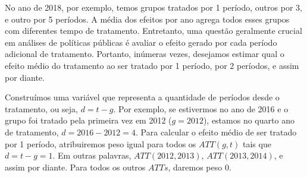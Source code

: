 \documentclass[portugues]{article}
\begin{document}
No ano de 2018, por exemplo, temos grupos tratados por 1 período, outros por 3, e outro por 5 períodos. A média dos efeitos por ano agrega todos esses grupos com diferentes tempo de tratamento. Entretanto, uma questão geralmente crucial em análises de políticas públicas é avaliar o efeito gerado por cada período adicional de tratamento. Portanto, inúmeras vezes, desejamos estimar qual o efeito médio do tratamento ao ser tratado por 1 período, por 2 períodos, e assim por diante. 

Construímos uma variável que representa a quantidade de períodos desde o tratamento, ou seja, $d = t - g$. Por exemplo, se estivermos no ano de 2016 e o grupo foi tratado pela primeira vez em 2012 ($g=2012$), estamos no quarto ano de tratamento, $d = 2016 - 2012 = 4$. Para calcular o efeito médio de ser tratado por 1 período, atribuiremos peso igual para todos os $ATT(g,t)$ tais que $d=t-g=1$. Em outras palavras, $ATT(2012,2013)$, $ATT(2013,2014)$, e assim por diante. Para todos os outros $ATTs$, daremos peso 0.
\end{document}
